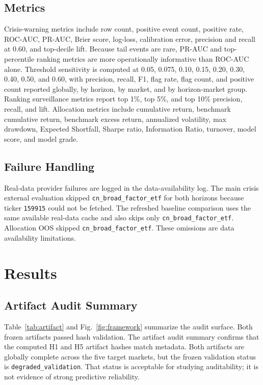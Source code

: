 \documentclass{ieeeaccess}
\begin{document}
\subsection{Metrics}
Crisis-warning metrics include row count, positive event count, positive rate, ROC-AUC, PR-AUC, Brier score, log-loss, calibration error, precision and recall at 0.60, and top-decile lift. Because tail events are rare, PR-AUC and top-percentile ranking metrics are more operationally informative than ROC-AUC alone. Threshold sensitivity is computed at 0.05, 0.075, 0.10, 0.15, 0.20, 0.30, 0.40, 0.50, and 0.60, with precision, recall, F1, flag rate, flag count, and positive count reported globally, by horizon, by market, and by horizon-market group. Ranking surveillance metrics report top 1\%, top 5\%, and top 10\% precision, recall, and lift. Allocation metrics include cumulative return, benchmark cumulative return, benchmark excess return, annualized volatility, max drawdown, Expected Shortfall, Sharpe ratio, Information Ratio, turnover, model score, and model grade.

\subsection{Failure Handling}
Real-data provider failures are logged in the data-availability log. The main crisis external evaluation skipped \texttt{cn\_broad\_factor\_etf} for both horizons because ticker \texttt{159915} could not be fetched. The refreshed baseline comparison uses the same available real-data cache and also skips only \texttt{cn\_broad\_factor\_etf}. Allocation OOS skipped \texttt{cn\_broad\_factor\_etf}. These omissions are data availability limitations.

\section{Results}
\label{sec:results}

\subsection{Artifact Audit Summary}
Table~\ref{tab:artifact} and Fig.~\ref{fig:framework} summarize the audit surface. Both frozen artifacts passed hash validation. The artifact audit summary confirms that the computed H1 and H5 artifact hashes match metadata. Both artifacts are globally complete across the five target markets, but the frozen validation status is \texttt{degraded\_validation}. That status is acceptable for studying auditability; it is not evidence of strong predictive reliability.
\end{document}
